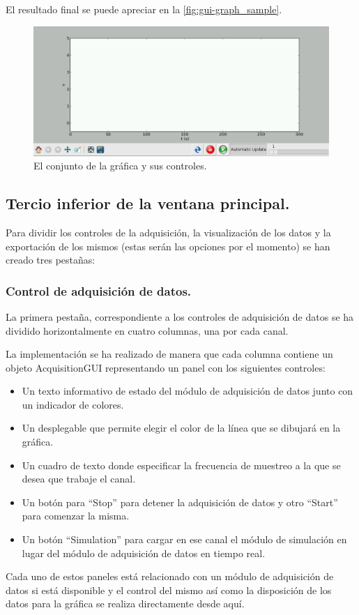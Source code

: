 	El resultado final se puede apreciar en la \autoref{fig:gui-graph_sample}.
\begin{figure}[hb]
  \centering
  \includegraphics[width=1\textwidth]{img/gui-graph_sample.png}
  \caption[El conjunto de la gráfica y sus controles en nuestro programa.]{El conjunto de la gráfica y sus controles.}
  \label{fig:gui-graph_sample}
\end{figure}

\subsection{Tercio inferior de la ventana principal.}
	Para dividir los controles de la adquisición, la visualización de los datos y la exportación de los mismos (estas serán las opciones por el momento) se han creado tres pestañas:
	
	\subsubsection{Control de adquisición de datos.}\label{sec:gui_AcquisitionGUI}
	La primera pestaña, correspondiente a los controles de adquisición de datos se ha dividido horizontalmente en cuatro columnas, una por cada canal. 
	
	La implementación se ha realizado de manera que cada columna contiene un objeto AcquisitionGUI representando un panel con los siguientes controles:
\begin{itemize}
	\item Un texto informativo de estado del módulo de adquisición de datos junto con un indicador de colores.
	\item Un desplegable que permite elegir el color de la línea que se dibujará en la gráfica.
	\item Un cuadro de texto donde especificar la frecuencia de muestreo a la que se desea que trabaje el canal.
	\item Un botón para ``Stop'' para detener la adquisición de datos y otro ``Start'' para comenzar la misma.
	\item Un botón ``Simulation'' para cargar en ese canal el módulo de simulación en lugar del módulo de adquisición de datos en tiempo real.
\end{itemize}
	Cada uno de estos paneles está relacionado con un módulo de adquisición de datos si está disponible y el control del mismo así como la disposición de los datos para la gráfica se realiza directamente desde aquí. 
	
